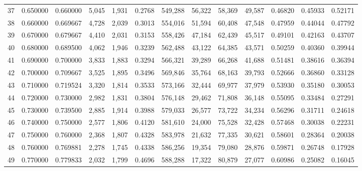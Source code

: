 \begin{tabular}{rrrrrrrrrrrrr}
37 &  0.650000 &  0.660000 &   5,045 &  1,931 &                                     0.2768 &  549,288 &   56,322 &   58,369 &   49,587 &  0.46820 &  0.45933 &  0.52171 \\
38 &  0.660000 &  0.669667 &   4,728 &  2,039 &                                     0.3013 &  554,016 &   51,594 &   60,408 &   47,548 &  0.47959 &  0.44044 &  0.47792 \\
39 &  0.670000 &  0.679667 &   4,410 &  2,031 &                                     0.3153 &  558,426 &   47,184 &   62,439 &   45,517 &  0.49101 &  0.42163 &  0.43707 \\
40 &  0.680000 &  0.689500 &   4,062 &  1,946 &                                     0.3239 &  562,488 &   43,122 &   64,385 &   43,571 &  0.50259 &  0.40360 &  0.39944 \\
41 &  0.690000 &  0.700000 &   3,833 &  1,883 &                                     0.3294 &  566,321 &   39,289 &   66,268 &   41,688 &  0.51481 &  0.38616 &  0.36394 \\
42 &  0.700000 &  0.709667 &   3,525 &  1,895 &                                     0.3496 &  569,846 &   35,764 &   68,163 &   39,793 &  0.52666 &  0.36860 &  0.33128 \\
43 &  0.710000 &  0.719524 &   3,320 &  1,814 &                                     0.3533 &  573,166 &   32,444 &   69,977 &   37,979 &  0.53930 &  0.35180 &  0.30053 \\
44 &  0.720000 &  0.730000 &   2,982 &  1,831 &                                     0.3804 &  576,148 &   29,462 &   71,808 &   36,148 &  0.55095 &  0.33484 &  0.27291 \\
45 &  0.730000 &  0.739500 &   2,885 &  1,914 &                                     0.3988 &  579,033 &   26,577 &   73,722 &   34,234 &  0.56296 &  0.31711 &  0.24618 \\
46 &  0.740000 &  0.750000 &   2,577 &  1,806 &                                     0.4120 &  581,610 &   24,000 &   75,528 &   32,428 &  0.57468 &  0.30038 &  0.22231 \\
47 &  0.750000 &  0.760000 &   2,368 &  1,807 &                                     0.4328 &  583,978 &   21,632 &   77,335 &   30,621 &  0.58601 &  0.28364 &  0.20038 \\
48 &  0.760000 &  0.769881 &   2,278 &  1,745 &                                     0.4338 &  586,256 &   19,354 &   79,080 &   28,876 &  0.59871 &  0.26748 &  0.17928 \\
49 &  0.770000 &  0.779833 &   2,032 &  1,799 &                                     0.4696 &  588,288 &   17,322 &   80,879 &   27,077 &  0.60986 &  0.25082 &  0.16045 \\

\end{tabular}
